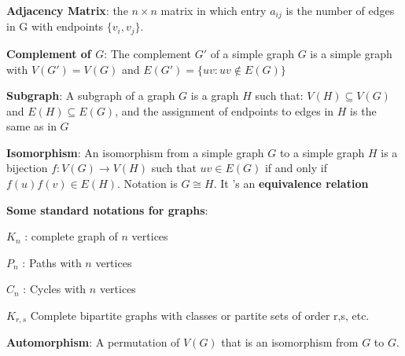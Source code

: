\documentclass{article}
\theoremstyle{definition}
\theoremstyle{definition}
\theoremstyle{named}
\begin{document}
\begin{citemize}
    
    \item \textbf{Adjacency Matrix}: the
$n \times n$ matrix in which entry $a_{ij}$ is the number
of edges in G with endpoints $\{v_i, v_j\}$.

    \item \textbf{Complement of $G$}: The complement $G'$ of a
simple graph $G$ is a simple graph with $V(G') = V(G)$ and  $E(G') = \{ uv : uv \notin E(G) \}$
    
    \item \textbf{Subgraph}: A subgraph of a graph $G$ is a graph $H$ such that:
$V(H) \subseteq V(G)$ and $E(H) \subseteq E(G)$, and the assignment of endpoints to edges in $H$ is the same as in $G$

    \item \textbf{Isomorphism}: An isomorphism from a simple graph $G$ to a
simple graph $H$ is a bijection $f:V(G) \rightarrow V(H)$ such
that $uv \in E(G)$ if and only if $f(u)f(v) \in E(H)$. Notation is $G \cong H$. It
's an \textbf{equivalence relation}
    \item \textbf{Some standard notations for graphs}:
    \begin{citemize}
        \item $K_n$ : complete graph of $n$ vertices
        \item $P_n$ : Paths with $n$ vertices
        \item $C_n$ : Cycles with $n$ vertices
        \item $K_{r,s}$ Complete bipartite graphs with classes or partite
sets of order r,s, etc.
    
    \end{citemize}
    \item \textbf{Automorphism}: A permutation of
$V(G)$ that is an isomorphism from $G$ to $G$.
\end{citemize}
\end{document}
